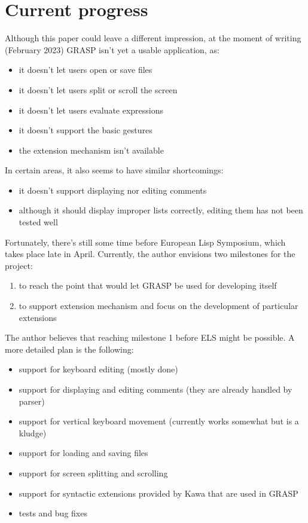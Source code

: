 \documentclass[sigconf]{acmart}
\begin{document}


\section{Current progress}

Although this paper could leave a different impression,
at the moment of writing (February 2023) GRASP isn't yet 
a usable application, as:
\begin{itemize}
\item it doesn't let users open or save files
\item it doesn't let users split or scroll the screen
\item it doesn't let users evaluate expressions
\item it doesn't support the basic gestures
\item the extension mechanism isn't available
\end{itemize}

In certain areas, it also seems to have similar
shortcomings:
\begin{itemize}
\item it doesn't support displaying nor editing
comments
\item although it should display improper lists correctly, 
editing them has not been tested well
\end{itemize}

Fortunately, there's still some time before
European Lisp Symposium, which takes place late
in April. Currently, the author envisions two
milestones for the project:
\begin{enumerate}
\item to reach the point that would let GRASP
be used for developing itself
\item to support extension mechanism and focus
on the development of particular extensions
\end{enumerate}

The author believes that reaching milestone 1
before ELS might be possible. A more detailed
plan is the following:
\begin{itemize}
\item support for keyboard editing (mostly done)
\item support for displaying and editing comments
(they are already handled by parser)
\item support for vertical keyboard movement
(currently works somewhat but is a kludge)
\item support for loading and saving files
\item support for screen splitting and scrolling
\item support for syntactic extensions provided
by Kawa that are used in GRASP
\item tests and bug fixes
\end{itemize}
\end{document}
